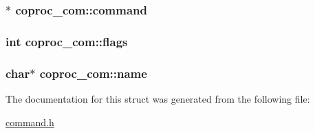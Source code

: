 \subsubsection[{\texorpdfstring{command}{command}}]{$\ast$ coproc\+\_\+com\+::command}\hypertarget{structcoproc__com_a22bba3feba2226cd96700bbc5502766f}{}\label{structcoproc__com_a22bba3feba2226cd96700bbc5502766f}
\subsubsection[{\texorpdfstring{flags}{flags}}]{\setlength{\rightskip}{0pt plus 5cm}int coproc\+\_\+com\+::flags}\hypertarget{structcoproc__com_a01d4593beb818d1f8b158b482194ad61}{}\label{structcoproc__com_a01d4593beb818d1f8b158b482194ad61}
\subsubsection[{\texorpdfstring{name}{name}}]{\setlength{\rightskip}{0pt plus 5cm}char$\ast$ coproc\+\_\+com\+::name}\hypertarget{structcoproc__com_a6d076457d5bc4a12617e68939a1f7afa}{}\label{structcoproc__com_a6d076457d5bc4a12617e68939a1f7afa}


The documentation for this struct was generated from the following file\+:\begin{DoxyCompactItemize}
\item 
\hyperlink{command_8h}{command.\+h}\end{DoxyCompactItemize}
